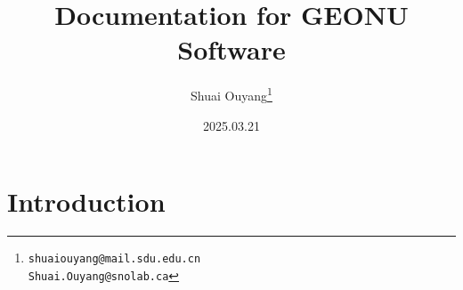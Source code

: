 
\usepackage{ctex}
\usepackage{multirow}  %
\usepackage{booktabs}  %

\title{\textbf{Documentation for GEONU Software}}
\author{Shuai Ouyang\thanks{\parbox[t]{4.5cm}{%
			\texttt{shuaiouyang@mail.sdu.edu.cn} \\ 
			\texttt{Shuai.Ouyang@snolab.ca}}}}
\date{2025.03.21}


	\maketitle							%
	\thispagestyle{empty}				%
	\frontmatter						%
	\cleardoublepage				 	%
	\tableofcontents				  	%
	\mainmatter							%
	\chapter{Introduction}
